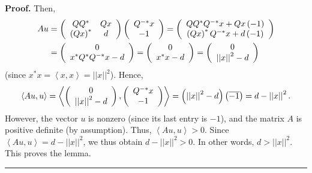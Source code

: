 \documentclass[numbers=enddot,12pt,final,onecolumn,notitlepage]{scrartcl}%
\numberwithin{exer}{subsection}
\theoremstyle{definition}
\newenvironment{proof}[1][Proof]{\noindent\textbf{#1.} }{\ \rule{0.5em}{0.5em}}
\begin{document}
\begin{proof}
Then,%
\begin{align*}
Au  & =\left(
\begin{array}
[c]{cc}%
QQ^{\ast} & Qx\\
\left(  Qx\right)  ^{\ast} & d
\end{array}
\right)  \left(
\begin{array}
[c]{c}%
Q^{-\ast}x\\
-1
\end{array}
\right)  =\left(
\begin{array}
[c]{c}%
QQ^{\ast}Q^{-\ast}x+Qx\left(  -1\right)  \\
\left(  Qx\right)  ^{\ast}Q^{-\ast}x+d\left(  -1\right)
\end{array}
\right)  \\
& =\left(
\begin{array}
[c]{c}%
0\\
x^{\ast}Q^{\ast}Q^{-\ast}x-d
\end{array}
\right)  =\left(
\begin{array}
[c]{c}%
0\\
x^{\ast}x-d
\end{array}
\right)  =\left(
\begin{array}
[c]{c}%
0\\
\left\vert \left\vert x\right\vert \right\vert ^{2}-d
\end{array}
\right)
\end{align*}
(since $x^{\ast}x=\left\langle x,x\right\rangle =\left\vert \left\vert
x\right\vert \right\vert ^{2}$). Hence,%
\[
\left\langle Au,u\right\rangle =\left\langle \left(
\begin{array}
[c]{c}%
0\\
\left\vert \left\vert x\right\vert \right\vert ^{2}-d
\end{array}
\right)  ,\left(
\begin{array}
[c]{c}%
Q^{-\ast}x\\
-1
\end{array}
\right)  \right\rangle =\left(  \left\vert \left\vert x\right\vert \right\vert
^{2}-d\right)  \left(  \overline{-1}\right)  =d-\left\vert \left\vert
x\right\vert \right\vert ^{2}.
\]
However, the vector $u$ is nonzero (since its last entry is $-1$), and the
matrix $A$ is positive definite (by assumption). Thus, $\left\langle
Au,u\right\rangle >0$. Since $\left\langle Au,u\right\rangle =d-\left\vert
\left\vert x\right\vert \right\vert ^{2}$, we thus obtain $d-\left\vert
\left\vert x\right\vert \right\vert ^{2}>0$. In other words, $d>\left\vert
\left\vert x\right\vert \right\vert ^{2}$. This proves the lemma.
\end{proof}
\end{document}
